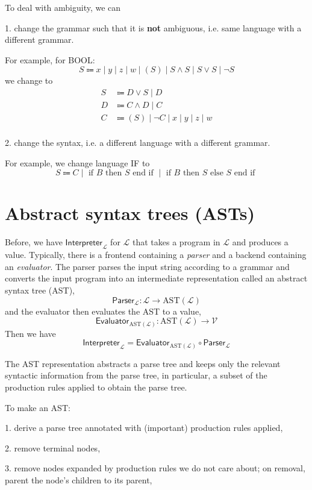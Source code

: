 To deal with ambiguity, we can

1. change the grammar such that it is \textbf{not} ambiguous, i.e. same language with a different grammar.

For example, for BOOL:
\[
  S \Coloneqq x \mid y \mid z \mid w \mid (S) \mid S \wedge S \mid S \vee S \mid \neg S
\]
we change to 
\[
\begin{aligned}
  S &\Coloneqq D \vee S \mid D \\
  D &\Coloneqq C \wedge D \mid C \\
  C &\Coloneqq (S) \mid \neg C \mid x \mid y \mid z \mid w \\
\end{aligned}
\]

2. change the syntax, i.e. a different language with a different grammar.

For example, we change language IF to 
\[
  S \Coloneqq C \mid \text{ if } B \text{ then } S \text{ end if } \mid \text{ if } B \text{ then } S \text{ else } S \text{ end if }
\]

\section{Abstract syntax trees (ASTs)}
Before, we have \(\mathsf{Interpreter}_{\mathcal{L}}\) for \(\mathcal{L}\) that takes a program in \(\mathcal{L}\) and produces a value. Typically, there is a frontend containing a \textit{parser} and a backend containing an \textit{evaluator}. The parser parses the input string according to a grammar and converts the input program into an intermediate representation called an abstract syntax tree (AST),
\[
  \textsf{Parser}_{\mathcal{L}}: \mathcal{L} \to \text{AST}(\mathcal{L}) 
\] 
and the evaluator then evaluates the AST to a value,
\[
  \textsf{Evaluator}_{\text{AST}(\mathcal{L})} : \text{AST}(\mathcal{L}) \to \mathcal{V}
\]
Then we have 
\[
  \textsf{Interpreter}_{\mathcal{L}} = \textsf{Evaluator}_{\text{AST}(\mathcal{L})} \circ \textsf{Parser}_{\mathcal{L}} 
\]

The AST representation abstracts a parse tree and keeps only the relevant syntactic information from the parse tree, in particular, a subset of the production rules applied to obtain the parse tree. 

To make an AST:

1. derive a parse tree annotated with (important) production rules applied,

2. remove terminal nodes,

3. remove nodes expanded by production rules we do not care about; on removal, parent the node's children to its parent,


